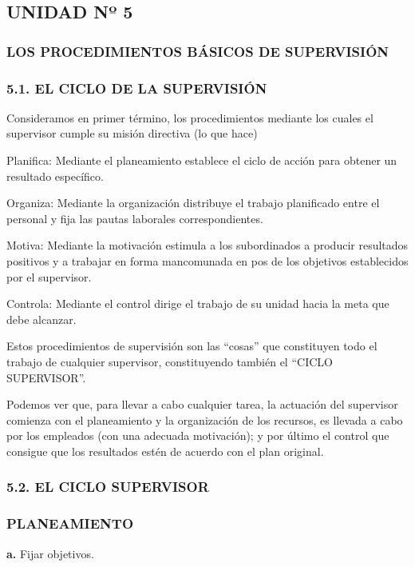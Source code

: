 
\subsection*{UNIDAD Nº 5}
\subsubsection*{LOS PROCEDIMIENTOS BÁSICOS DE SUPERVISIÓN}
\subsubsection*{5.1. EL CICLO DE LA SUPERVISIÓN}
Consideramos en primer término, los procedimientos mediante los cuales el supervisor cumple su misión directiva (lo que hace)

Planifica: Mediante el planeamiento establece el ciclo de acción para obtener un resultado específico.

Organiza: Mediante la organización distribuye el trabajo planificado entre el personal y fija las pautas laborales correspondientes.

Motiva: Mediante la motivación estimula a los subordinados a producir resultados positivos y a trabajar en forma mancomunada en pos de los objetivos establecidos por el supervisor.

Controla: Mediante el control dirige el trabajo de su unidad hacia la meta que debe alcanzar.

Estos procedimientos de supervisión son las “cosas” que constituyen todo el trabajo de cualquier supervisor, constituyendo también el “CICLO SUPERVISOR”.

Podemos ver que, para llevar a cabo cualquier tarea, la actuación del supervisor comienza con el planeamiento y la organización de los recursos, es llevada a cabo por los empleados (con una adecuada motivación); y por último el control que consigue que los resultados estén de acuerdo con el plan original.

\subsubsection*{5.2. EL CICLO SUPERVISOR}


\subsubsection*{PLANEAMIENTO}
\textbf{a. }Fijar objetivos.

